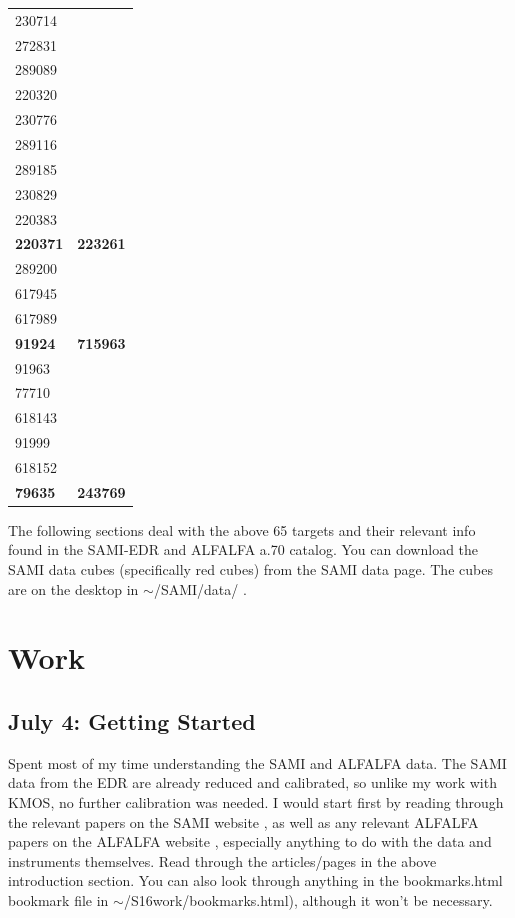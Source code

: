 \documentclass[10pt,letterpaper]{article}
\begin{document}
\begin{table}[h!]
{\begin{tabular}{|l|l|}
230714 & \\
272831 & \\
289089 & \\
220320 & \\
230776 & \\
289116 & \\
289185 & \\
230829 & \\
220383 & \\
\textbf{220371} & \textbf{223261}\\
289200 & \\
617945 & \\
617989 & \\
\textbf{91924} & \textbf{715963}\\
91963 & \\
77710 & \\
618143 & \\
91999 & \\
618152 & \\
\textbf{79635} & \textbf{243769}\\ \hline
\end{tabular}}
\end{table}

\newpage
The following sections deal with the above 65 targets and their relevant info found in the SAMI-EDR and ALFALFA a.70 catalog. You can download the SAMI data cubes (specifically red cubes) from the SAMI data page. The cubes are on the desktop in $\sim$/SAMI/data/ .

\newpage
\section{Work}
\subsection{July 4: Getting Started}
Spent most of my time understanding the SAMI and ALFALFA data. The SAMI data from the EDR are already reduced and calibrated, so unlike my work with KMOS, no further calibration was needed. I would start first by reading through the relevant papers on the SAMI website \cite{SAMI instrument front-page}, as well as any relevant ALFALFA papers on the ALFALFA website \cite{ALFALFA front-page}, especially anything to do with the data and instruments themselves. Read through the articles/pages in the above introduction section. You can also look through anything in the bookmarks.html bookmark file in $\sim$/S16work/bookmarks.html), although it won't be necessary.\\
\end{document}
